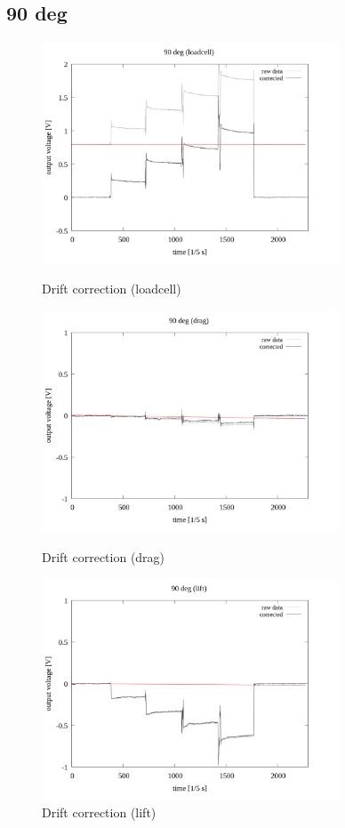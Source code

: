 \documentclass[twocolumn,a4j]{jsarticle}
\begin{document}
\newpage
\subsection{90 deg}
\begin{figure}[htbp]
    \footnotesize
    \begin{center}
        \includegraphics[width=88mm]{../images/drift/90_loadcell_drift.png}
        \caption{Drift correction (loadcell)}
        \includegraphics[width=88mm]{../images/drift/90_drag_drift.png}
        \caption{Drift correction (drag)}
        \includegraphics[width=88mm]{../images/drift/90_lift_drift.png}
        \caption{Drift correction (lift)}
    \end{center}
\end{figure}
\end{document}
